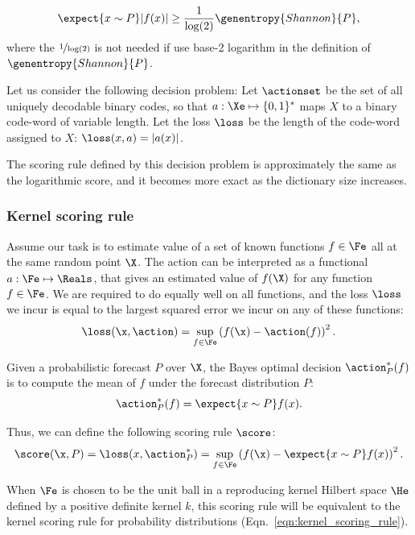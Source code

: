 \begin{equation}
	\expect{x \sim P} \vert f(x) \vert \geq \frac{1}{\log(2)}\genentropy{Shannon}{P},
\end{equation}
%
where the $\nicefrac{1}{\log(2)}$ is not needed if use base-2 logarithm in the definition of $\genentropy{Shannon}{P}$.
 
Let us consider the following decision problem: Let $\actionset$ be the set of all uniquely decodable binary codes, so that $a:\Xe\mapsto\{0,1\}^{*}$ maps $X$ to a binary code-word of variable length. Let the loss $\loss$ be the length of the code-word assigned to $X$: $\loss(x,a) = \vert a(x)\vert$.

The scoring rule defined by this decision problem is approximately the same as the logarithmic score, and it becomes more exact as the dictionary size increases.

\subsubsection{Kernel scoring rule}

Assume our task is to estimate value of a set of known functions $f\in{\Fe}$ all at the same random point $\X$. The action can be interpreted as a functional $a:\Fe\mapsto\Reals$, that gives an estimated value of $f(\X)$ for any function $f\in\Fe$. We are required to do equally well on all functions, and the loss $\loss$ we incur is equal to the largest squared error we incur on any of these functions:
%
\begin{equation}
	\loss(\x, \action) = \sup_{f\in\Fe}\left( f(\x) - \action(f)\right)^2.
\end{equation}

Given a probabilistic forecast $P$ over $\X$, the Bayes optimal decision $\action^{*}_{P}(f)$ is to compute the mean of $f$ under the forecast distribution $P$:
%
\begin{equation}
	\action^{*}_{P}(f) = \expect{x\sim P} f(x).
\end{equation}

Thus, we can define the following scoring rule $\score$:
%
\begin{equation}
	\score(\x,P) = \loss(x,\action^{*}_{P} )
		= 	\sup_{f\in\Fe}\left( f(\x) - \expect{x\sim P} f(x) \right)^2.
\end{equation}

When $\Fe$ is chosen to be the unit ball in a reproducing kernel Hilbert space $\He$ defined by a positive definite kernel $k$, this scoring rule will be equivalent to the kernel scoring rule for probability distributions (Eqn.\ \eqref{eqn:kernel_scoring_rule}).


